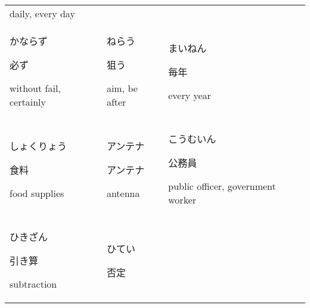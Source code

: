 \documentclass[12pt, a4j, landscape, dvipdfmx]{utarticle}
\begin{document}
\begin{minipage}[t][0pt]{\linewidth }
\begin{tabular}{||p{5.5cm}||p{5.5cm}||p{5.5cm}||}
{\small daily, every day}\tabularnewline \hhline{|:=::=::=:|} \rule{0pt}{3ex} \hspace*{-.4cm} {\LARGE かならず}\newline \rule{0pt}{3ex} \hspace*{.4cm} {\small 必ず}\newline \rule{0pt}{3ex} \hspace*{.425cm} {\small without fail, certainly}&\rule{0pt}{3ex} \hspace*{-.4cm} {\LARGE ねらう}\newline \rule{0pt}{3ex} \hspace*{.4cm} {\small 狙う}\newline \rule{0pt}{3ex} \hspace*{.425cm} {\small aim, be after}&\rule{0pt}{3ex} \hspace*{-.4cm} {\LARGE まいねん}\newline \rule{0pt}{3ex} \hspace*{.4cm} {\small 毎年}\newline \rule{0pt}{3ex} \hspace*{.425cm} {\small every year}\tabularnewline \hhline{|:=::=::=:|} \rule{0pt}{3ex} \hspace*{-.4cm} {\LARGE しょくりょう}\newline \rule{0pt}{3ex} \hspace*{.4cm} {\small 食料}\newline \rule{0pt}{3ex} \hspace*{.425cm} {\small food supplies}&\rule{0pt}{3ex} \hspace*{-.4cm} {\LARGE アンテナ}\newline \rule{0pt}{3ex} \hspace*{.4cm} {\small アンテナ}\newline \rule{0pt}{3ex} \hspace*{.425cm} {\small antenna}&\rule{0pt}{3ex} \hspace*{-.4cm} {\LARGE こうむいん}\newline \rule{0pt}{3ex} \hspace*{.4cm} {\small 公務員}\newline \rule{0pt}{3ex} \hspace*{.425cm} {\small public officer, government worker}\tabularnewline \hhline{|:=::=::=:|} \rule{0pt}{3ex} \hspace*{-.4cm} {\LARGE ひきざん}\newline \rule{0pt}{3ex} \hspace*{.4cm} {\small 引き算}\newline \rule{0pt}{3ex} \hspace*{.425cm} {\small subtraction}&\rule{0pt}{3ex} \hspace*{-.4cm} {\LARGE ひてい}\newline \rule{0pt}{3ex} \hspace*{.4cm} {\small 否定}\newline 
\end{tabular}
\end{minipage}
\end{document}

